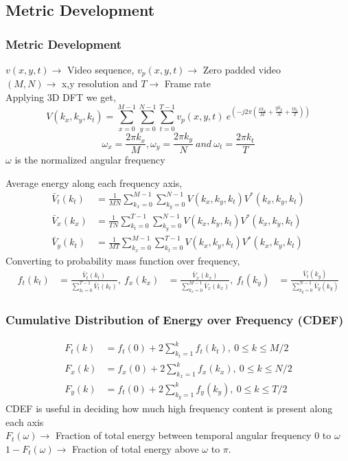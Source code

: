 \documentclass{beamer}
\begin{document}
\subsection{Metric Development}
\begin{frame}\frametitle{Metric Development}
$v(x,y,t) \rightarrow$ Video sequence, $v_p(x,y,t) \rightarrow$ Zero padded video \\
$(M,N) \rightarrow$  x,y resolution and $T \rightarrow$ Frame rate \\
Applying 3D DFT we get,
\begin{equation}
V(k_{x},k_{y},k_{t}) = \sum\limits_{x=0}^{M-1} \sum\limits_{y=0}^{N-1} \sum\limits_{t=0}^{T-1} v_p(x,y,t) \ e^{\left(-j2\pi\left(\frac{xk_x}{M} + \frac{yk_y}{N} + \frac{tk_t}{T}\right)\right)}
\end{equation}
\begin{equation}
\omega_x = \frac{2\pi k_x}{M}, \omega_y = \frac{2\pi k_y}{N} \ and \ \omega_t = \frac{2\pi k_t}{T}
\end{equation}
$\omega$ is the normalized angular frequency
\end{frame}

\begin{frame}
Average energy along each frequency axis,
\begin{align}
\bar{V}_t(k_t) &= \frac{1}{MN} \sum\limits_{k_x=0}^{M-1} \sum\limits_{k_y=0}^{N-1} V(k_x,k_y,k_t) V^*(k_x,k_y,k_t) \\
\bar{V}_x(k_x) &= \frac{1}{TN} \sum\limits_{k_t=0}^{T-1} \sum\limits_{k_y=0}^{N-1} V(k_x,k_y,k_t) V^*(k_x,k_y,k_t) \\
\bar{V}_y(k_t) &= \frac{1}{MT} \sum\limits_{k_x=0}^{M-1} \sum\limits_{k_t=0}^{T-1} V(k_x,k_y,k_t) V^*(k_x,k_y,k_t)
\end{align}
Converting to probability mass function over frequency,
\begin{align}
f_t(k_t) &= \frac{\bar{V}_t(k_t)}{\sum\limits_{k_t=0}^{T-1}\bar{V}_t(k_t)}, \
f_x(k_x) &= \frac{\bar{V}_x(k_x)}{\sum\limits_{k_x=0}^{M-1}\bar{V}_x(k_x)}, \
f_t(k_y) &= \frac{\bar{V}_t(k_y)}{\sum\limits_{k_y=0}^{N-1}\bar{V}_y(k_y)}
\end{align}
\end{frame}

\begin{frame}\frametitle{Cumulative Distribution of Energy over Frequency (CDEF)}
\vspace{-9 mm}
\begin{align}
F_t(k) &= f_t(0) + 2\sum\limits_{k_t=1}^{k} f_t(k_t), \ 0 \leq k \leq M/2\\
F_x(k) &= f_x(0) + 2\sum\limits_{k_x=1}^{k} f_x(k_x), \ 0 \leq k \leq N/2\\
F_y(k) &= f_t(0) + 2\sum\limits_{k_y=1}^{k} f_y(k_y), \ 0 \leq k \leq T/2
\end{align}
CDEF is useful in deciding how much high frequency content is present along each axis \\
$F_t(\omega) \rightarrow$ Fraction of total energy between temporal angular frequency $0$ to $\omega$ \\
$1 - F_t(\omega) \rightarrow$ Fraction of total energy above $\omega$ to $\pi.$ 
\end{frame}
\end{document}
